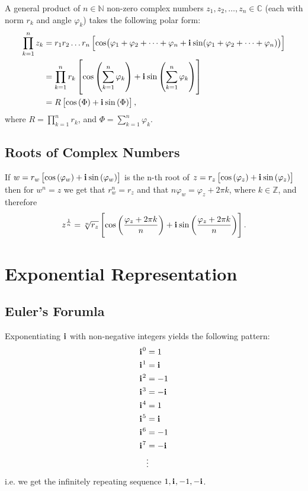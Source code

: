 \documentclass{article}
\newcommand{\iu}{\mathbf{i}\mkern1mu}
\newcommand{\zpolar}[2]{#1\left[\cos\left(#2\right)+\iu\sin\left(#2\right)\right]}
\begin{document}
A general product of $n\in\mathbb{N}$ non-zero complex numbers $z_{1},z_{2},\dots,z_{n}\in\mathbb{C}$ (each with norm $r_{k}$ and angle $\varphi_{k}$) takes the following polar form:
\begin{equation}
	\begin{aligned}
		\prod\limits_{k=1}^{n}z_{k} & = r_{1}r_{2}\dots r_{n}\left[ \cos(\varphi_{1}+\varphi_{2}+\dots+\varphi_{n} + \iu\sin(\varphi_{1}+\varphi_{2}+\dots+\varphi_{n})) \right] \\
		                            & = \zpolar{\prod\limits_{k=1}^{n}r_{k}}{\sum\limits_{k=1}^{n}\varphi_{k}}                                                                   \\
		                            & = \zpolar{R}{\Phi},
	\end{aligned}
	\label{eq:product_of_n_complex_nums}
\end{equation}
where $R = \prod\limits_{k=1}^{n}r_{k}$, and $\Phi=\sum\limits_{k=1}^{n}\varphi_{k}$.

\subsection{Roots of Complex Numbers}
If $w=\zpolar{r_{w}}{\varphi_{w}}$ is the n-th root of $z=\zpolar{r_{z}}{\varphi_{z}}$ then for $w^{n}=z$ we get that $r_{w}^{n}=r_{z}$ and that $n\varphi_{w}=\varphi_{z} + 2\pi k$, where $k\in\mathbb{Z}$, and therefore
\begin{equation}
	z^{\frac{1}{n}} = \zpolar{\sqrt[n]{r_{z}}}{\frac{\varphi_{z}+2\pi k}{n}}.
	\label{eq:nth_root_of_z}
\end{equation}

\section{Exponential Representation}
\subsection{Euler's Forumla}
Exponentiating $\iu$ with non-negative integers yields the following pattern:
\begin{align*}
	\iu^0 & = 1    \\
	\iu^1 & = \iu  \\
	\iu^2 & = -1   \\
	\iu^3 & = -\iu \\
	\iu^4 & = 1    \\
	\iu^5 & = \iu  \\
	\iu^6 & = -1   \\
	\iu^7 & = -\iu \\
	      & \vdots
\end{align*}
i.e. we get the infinitely repeating sequence ${1, \iu, -1, -\iu}$.
\end{document}
